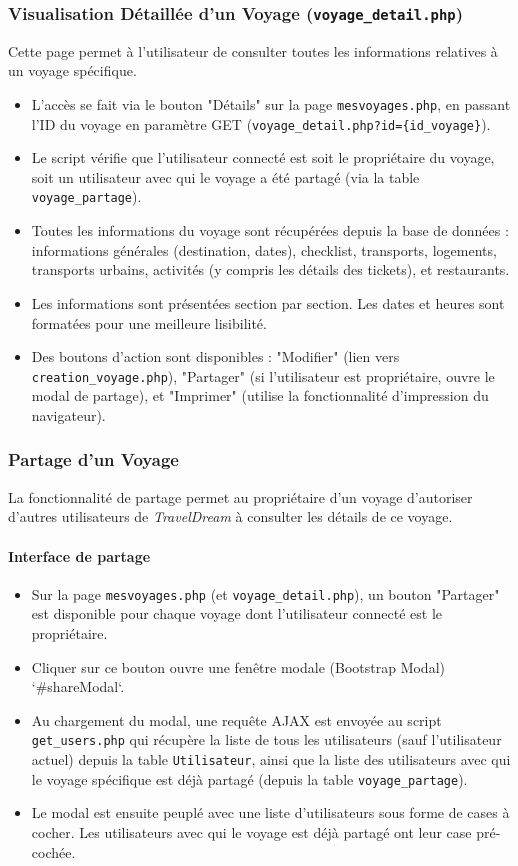 \documentclass[a4paper,12pt]{article}
\begin{document}
\subsubsection{Visualisation Détaillée d'un Voyage (\texttt{voyage\_detail.php})}
Cette page permet à l'utilisateur de consulter toutes les informations relatives à un voyage spécifique.
\begin{itemize}
    \item L'accès se fait via le bouton "Détails" sur la page \texttt{mesvoyages.php}, en passant l'ID du voyage en paramètre GET (\texttt{voyage\_detail.php?id=\{id\_voyage\}}).
    \item Le script vérifie que l'utilisateur connecté est soit le propriétaire du voyage, soit un utilisateur avec qui le voyage a été partagé (via la table \texttt{voyage\_partage}).
    \item Toutes les informations du voyage sont récupérées depuis la base de données : informations générales (destination, dates), checklist, transports, logements, transports urbains, activités (y compris les détails des tickets), et restaurants.
    \item Les informations sont présentées section par section. Les dates et heures sont formatées pour une meilleure lisibilité.
    \item Des boutons d'action sont disponibles : "Modifier" (lien vers \texttt{creation\_voyage.php}), "Partager" (si l'utilisateur est propriétaire, ouvre le modal de partage), et "Imprimer" (utilise la fonctionnalité d'impression du navigateur).
\end{itemize}

\subsubsection{Partage d'un Voyage}
La fonctionnalité de partage permet au propriétaire d'un voyage d'autoriser d'autres utilisateurs de \textit{TravelDream} à consulter les détails de ce voyage.
\paragraph{Interface de partage}
\begin{itemize}
    \item Sur la page \texttt{mesvoyages.php} (et \texttt{voyage\_detail.php}), un bouton "Partager" est disponible pour chaque voyage dont l'utilisateur connecté est le propriétaire.
    \item Cliquer sur ce bouton ouvre une fenêtre modale (Bootstrap Modal) `\#shareModal`.
    \item Au chargement du modal, une requête AJAX est envoyée au script \texttt{get\_users.php} qui  récupère la liste de tous les utilisateurs (sauf l'utilisateur actuel) depuis la table \texttt{Utilisateur}, ainsi que la liste des utilisateurs avec qui le voyage spécifique est déjà partagé (depuis la table \texttt{voyage\_partage}).
    \item Le modal est ensuite peuplé avec une liste d'utilisateurs sous forme de cases à cocher. Les utilisateurs avec qui le voyage est déjà partagé ont leur case pré-cochée.
\end{itemize}
\end{document}
